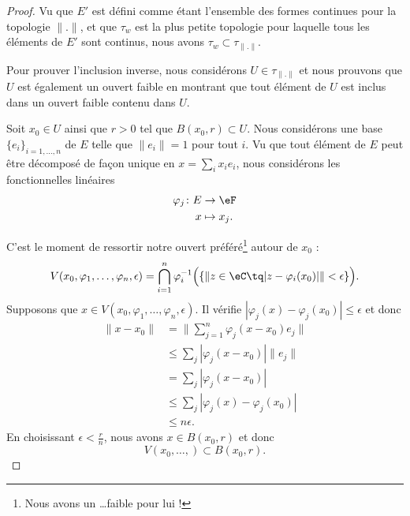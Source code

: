 \begin{proof}
	Vu que \( E'\) est défini comme étant l'ensemble des formes continues pour la topologie \( \| . \|\), et que \( \tau_w\) est la plus petite topologie pour laquelle tous les éléments de \( E'\) sont continus, nous avons \( \tau_w\subset\tau_{\| . \|}\).

	Pour prouver l'inclusion inverse, nous considérons \( U\in\tau_{\| . \|}\) et nous prouvons que \( U\) est également un ouvert faible en montrant que tout élément de $U$ est inclus dans un ouvert faible contenu dans \( U\).


	Soit \( x_0\in U\) ainsi que \( r>0\) tel que \( B(x_0,r)\subset U\). Nous considérons une base \( \{ e_i \}_{i=1,\ldots, n}\) de \( E\) telle que \( \| e_i \|=1\) pour tout \( i\). Vu que tout élément de \( E\) peut être décomposé de façon unique en \( x=\sum_ix_ie_i\), nous considérons les fonctionnelles linéaires
	\begin{equation}
		\begin{aligned}
			\varphi_j\colon E & \to \eF      \\
			x                 & \mapsto x_j.
		\end{aligned}
	\end{equation}

	C'est le moment de ressortir notre ouvert préféré\footnote{Nous avons un \ldots faible pour lui !} autour de \( x_0\) :
	\begin{equation}
		V(x_0,\varphi_1,\ldots, \varphi_n,\epsilon)=\bigcap_{i=1}^n\varphi_i^{-1}\Big( \{  \| z\in \eC\tq | z-\varphi_i(x_0) | \|<\epsilon  \} \Big).
	\end{equation}
	Supposons que \( x\in V(x_0,\varphi_1,\ldots, \varphi_n,\epsilon)\). Il vérifie \( | \varphi_j(x)-\varphi_j(x_0) |\leq \epsilon\) et donc
	\begin{subequations}
		\begin{align}
			\| x-x_0 \| & =\| \sum_{j=1}^n\varphi_j(x-x_0)e_j \|     \\
			            & \leq \sum_j| \varphi_j(x-x_0) |\| e_j \|   \\
			            & = \sum_j| \varphi_j(x-x_0) |               \\
			            & \leq \sum_j| \varphi_j(x)-\varphi_j(x_0) | \\
			            & \leq n\epsilon.
		\end{align}
	\end{subequations}
	En choisissant \( \epsilon<\frac{ r }{ n }\), nous avons \( x\in B(x_0,r)\) et donc
	\begin{equation}
		V(x_0,\ldots, )\subset B(x_0,r).
	\end{equation}
\end{proof}

